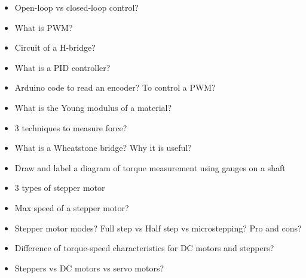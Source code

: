 \documentclass[compress]{beamer}
\begin{document}
\begin{frame}[plain]
    \begin{center}
        \begin{itemize}
        \item {Open-loop vs closed-loop control?}
        \item {What is PWM?}
        \item {Circuit of a H-bridge?}
        \item {What is a PID controller?}
        \item {Arduino code to read an encoder? To control a PWM?}
        \end{itemize}
    \end{center}
\end{frame}

\begin{frame}[plain]
    \begin{center}
        \begin{itemize}
        \item {What is the Young modulus of a material?}
        \item {3 techniques to measure force?}
        \item {What is a Wheatstone bridge? Why it is useful?}
        \item {Draw and label a diagram of torque measurement using gauges on a shaft}
        \end{itemize}
    \end{center}
\end{frame}

\begin{frame}[plain]
    \begin{center}
        \begin{itemize}
        \item {3 types of stepper motor}
        \item {Max speed of a stepper motor?}
        \item {Stepper motor modes? Full step vs Half step vs microstepping? Pro and cons?}
        \item {Difference of torque-speed characteristics for DC motors and steppers?}
        \item {Steppers vs DC motors vs servo motors?}
        \end{itemize}
    \end{center}
\end{frame}
\end{document}

